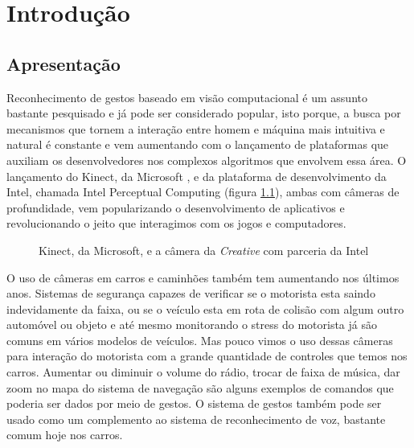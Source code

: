 \chapter{Introdução}

\section{Apresentação}

Reconhecimento de gestos baseado em visão computacional é um assunto bastante pesquisado e já pode ser considerado popular, isto porque, a busca por mecanismos que tornem a interação entre homem e máquina mais intuitiva e natural é constante e vem aumentando com o lançamento de plataformas que auxiliam os desenvolvedores nos complexos algoritmos que envolvem essa área.
O lançamento do Kinect, da Microsoft \cite{kinect}, e da plataforma de desenvolvimento da Intel, chamada Intel Perceptual Computing \cite{intel} (figura \ref{fig:depth_camera}),  ambas com câmeras de profundidade, vem popularizando o desenvolvimento de aplicativos e revolucionando o jeito que interagimos com os jogos e computadores. 

\begin{figure}[ht!]
\centering
{}
  \caption{Kinect, da Microsoft, e a câmera da \textit{Creative} com parceria da Intel}
  \label{fig:depth_camera}
\end{figure}

O uso de câmeras em carros e caminhões também tem aumentando nos últimos anos. Sistemas de segurança capazes de verificar se o motorista esta saindo indevidamente da faixa, ou se o veículo esta em rota de colisão com algum outro automóvel ou objeto e até mesmo monitorando o stress do motorista já são comuns em vários modelos de veículos. Mas pouco vimos o uso dessas câmeras para interação do motorista com a grande quantidade de controles que temos nos carros. Aumentar ou diminuir o volume do rádio, trocar de faixa de música, dar zoom no mapa do sistema de navegação são alguns exemplos de comandos que poderia ser dados por meio de gestos.
O sistema de gestos também pode ser usado como um complemento ao sistema de reconhecimento de voz, bastante comum hoje nos carros.


